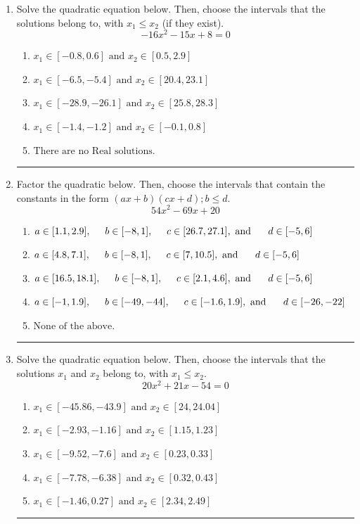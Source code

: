 \documentclass[14pt]{extbook}
\newcommand{\litem}[1]{\item#1\hspace*{-1cm}\rule{\textwidth}{0.4pt}}
\begin{document}
\begin{enumerate}
\litem{
Solve the quadratic equation below. Then, choose the intervals that the solutions belong to, with $x_1 \leq x_2$ (if they exist).\[ -16x^{2} -15 x + 8 = 0 \]\begin{enumerate}[label=\Alph*.]
\item \( x_1 \in [-0.8, 0.6] \text{ and } x_2 \in [0.5, 2.9] \)
\item \( x_1 \in [-6.5, -5.4] \text{ and } x_2 \in [20.4, 23.1] \)
\item \( x_1 \in [-28.9, -26.1] \text{ and } x_2 \in [25.8, 28.3] \)
\item \( x_1 \in [-1.4, -1.2] \text{ and } x_2 \in [-0.1, 0.8] \)
\item \( \text{There are no Real solutions.} \)

\end{enumerate} }
\litem{
Factor the quadratic below. Then, choose the intervals that contain the constants in the form $(ax+b)(cx+d); b \leq d.$\[ 54x^{2} -69 x + 20 \]\begin{enumerate}[label=\Alph*.]
\item \( a \in [1.1, 2.9], \hspace*{5mm} b \in [-8, 1], \hspace*{5mm} c \in [26.7, 27.1], \text{ and } \hspace*{5mm} d \in [-5, 6] \)
\item \( a \in [4.8, 7.1], \hspace*{5mm} b \in [-8, 1], \hspace*{5mm} c \in [7, 10.5], \text{ and } \hspace*{5mm} d \in [-5, 6] \)
\item \( a \in [16.5, 18.1], \hspace*{5mm} b \in [-8, 1], \hspace*{5mm} c \in [2.1, 4.6], \text{ and } \hspace*{5mm} d \in [-5, 6] \)
\item \( a \in [-1, 1.9], \hspace*{5mm} b \in [-49, -44], \hspace*{5mm} c \in [-1.6, 1.9], \text{ and } \hspace*{5mm} d \in [-26, -22] \)
\item \( \text{None of the above.} \)

\end{enumerate} }
\litem{
Solve the quadratic equation below. Then, choose the intervals that the solutions $x_1$ and $x_2$ belong to, with $x_1 \leq x_2$.\[ 20x^{2} +21 x -54 = 0 \]\begin{enumerate}[label=\Alph*.]
\item \( x_1 \in [-45.86, -43.9] \text{ and } x_2 \in [24, 24.04] \)
\item \( x_1 \in [-2.93, -1.16] \text{ and } x_2 \in [1.15, 1.23] \)
\item \( x_1 \in [-9.52, -7.6] \text{ and } x_2 \in [0.23, 0.33] \)
\item \( x_1 \in [-7.78, -6.38] \text{ and } x_2 \in [0.32, 0.43] \)
\item \( x_1 \in [-1.46, 0.27] \text{ and } x_2 \in [2.34, 2.49] \)


\end{enumerate}}
\end{enumerate}
\end{document}
